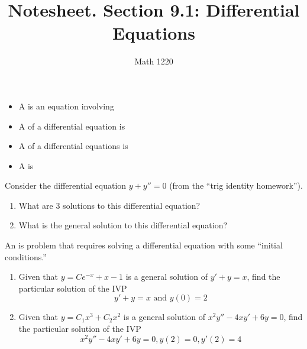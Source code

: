 \documentclass[12pt, a4paper]{article}
\author{Math 1220}
\title{Notesheet. Section 9.1: Differential Equations}
\date{}
\begin{document}
\maketitle
\nameline
\begin{defi}
  \begin{itemize}
  \item A  is an equation involving
    \vspace{0.5in}
  \item A  of a differential equation is
    \vspace{0.5in}
  \item A  of a differential equations is
    \vspace{0.5in}
  \item A  is 
  \end{itemize}
\end{defi}
\begin{ex}
  Consider the differential equation \(y+y'' = 0\) (from the ``trig
  identity homework'').
  \begin{enumerate}
  \item What are \(3\) solutions to this differential equation?
    \vspace{1in}
  \item What is the general solution to this differential equation?
  \end{enumerate}
\end{ex}
\vspace{-1in}
\begin{defi}
  An  is problem that requires solving
  a differential equation with some ``initial conditions.''
\end{defi}
\begin{ex}
  \begin{enumerate}
  \item   Given that \(y=Ce^{-x}+x-1\) is a general solution of \(y'+y=x\),
  find the particular solution of the IVP \[
    y'+y=x \text{ and } y(0) = 2
  \]
  \vspace{1in}
  \item Given that \(y=C_1 x^3 + C_2x^2\) is a general solution of
    \(x^2y''-4xy'+6y = 0\), find the particular solution of the IVP \[
      x^2y''-4xy'+6y = 0, y(2) = 0, y'(2) = 4
    \]
  \end{enumerate}
\end{ex}
\vspace{-1in}
\end{document}
